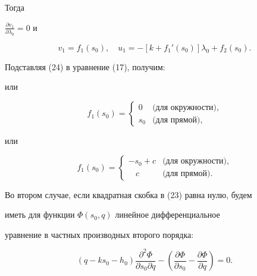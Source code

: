 Тогда


$


\frac{\partial v_1}{\partial \lambda_0} = 0$ и


\begin{equation}


v_1 = f_1(s_0), \quad


u_1 = - \left[k + f_1'(s_0)\right] \lambda_0 + f_2(s_0).


\end{equation}


Подставляя (24) в уравнение (17),  получим:





или


\[ f_1(s_0) =


\begin{cases}


0  & \mbox{(для окружности)},\\


s_0  & \mbox{(для прямой), }


\end{cases}


\]





или


\[


f_1(s_0) =


\begin{cases}


- s_0 + c  & \mbox{(для окружности)}, \\


\:\:\:\: c  & \mbox{(для прямой)}.


\end{cases}


 \]





Во втором случае,  если квадратная скобка в (23) равна нулю,  будем


иметь для функции $\Phi(s_0, q)$ линейное дифференциальное


уравнение в частных производных второго порядка:


\[


(q - k s_0 - h_0) \frac{{\partial}^2 \Phi}{\partial s_0


\partial q} - \left(\frac{\partial \Phi}{\partial


s_0} - \frac{\partial \Phi}{\partial q} \right) = 0.


\]


